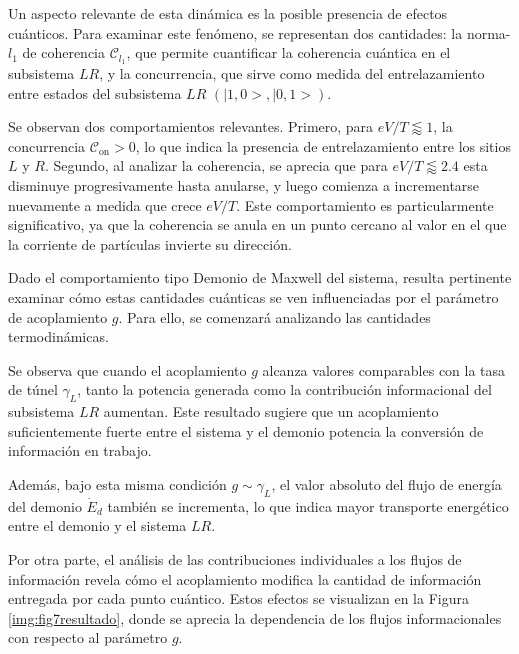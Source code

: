Un aspecto relevante de esta dinámica es la posible presencia de efectos cuánticos. Para examinar este fenómeno, se representan dos cantidades: la norma-$l_{1}$ de coherencia \( \mathcal{C}_{l_{1}} \), que permite cuantificar la coherencia cuántica en el subsistema \( LR \), y la concurrencia, que sirve como medida del entrelazamiento entre estados del subsistema $LR$ $(|1,0>,|0,1>)$.


Se observan dos comportamientos relevantes. Primero, para \( eV/T \lessapprox 1 \), la concurrencia \( \mathcal{C}_{\text{on}} > 0 \), lo que indica la presencia de entrelazamiento entre los sitios \( L \) y \( R \). Segundo, al analizar la coherencia, se aprecia que para \( eV/T \lessapprox 2.4 \) esta disminuye progresivamente hasta anularse, y luego comienza a incrementarse nuevamente a medida que crece \( eV/T \). Este comportamiento es particularmente significativo, ya que la coherencia se anula en un punto cercano al valor en el que la corriente de partículas invierte su dirección.

Dado el comportamiento tipo Demonio de Maxwell del sistema, resulta pertinente examinar cómo estas cantidades cuánticas se ven influenciadas por el parámetro de acoplamiento \( g \). Para ello, se comenzará analizando las cantidades termodinámicas.


Se observa que cuando el acoplamiento \( g \) alcanza valores comparables con la tasa de túnel \( \gamma_{L} \), tanto la potencia generada como la contribución informacional del subsistema \( LR \) aumentan. Este resultado sugiere que un acoplamiento suficientemente fuerte entre el sistema y el demonio potencia la conversión de información en trabajo. 

Además, bajo esta misma condición \( g \sim \gamma_{L} \), el valor absoluto del flujo de energía del demonio \( \dot{E}_{d} \) también se incrementa, lo que indica mayor transporte energético entre el demonio y el sistema $LR$.

Por otra parte, el análisis de las contribuciones individuales a los flujos de información revela cómo el acoplamiento modifica la cantidad de información entregada por cada punto cuántico. Estos efectos se visualizan en la Figura \ref{img:fig7resultado}, donde se aprecia la dependencia de los flujos informacionales con respecto al parámetro \( g \).

